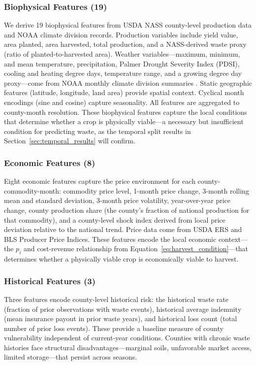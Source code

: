\documentclass[preprint,12pt,authoryear]{elsarticle}
\begin{document}
\subsubsection{Biophysical Features (19)}

We derive 19 biophysical features from USDA NASS county-level production data and NOAA climate division records. Production variables include yield value, area planted, area harvested, total production, and a NASS-derived waste proxy (ratio of planted-to-harvested area). Weather variables---maximum, minimum, and mean temperature, precipitation, Palmer Drought Severity Index (PDSI), cooling and heating degree days, temperature range, and a growing degree day proxy---come from NOAA monthly climate division summaries \citep{noaa2024}. Static geographic features (latitude, longitude, land area) provide spatial context. Cyclical month encodings (sine and cosine) capture seasonality. All features are aggregated to county-month resolution. These biophysical features capture the local conditions that determine whether a crop is physically viable---a necessary but insufficient condition for predicting waste, as the temporal split results in Section~\ref{sec:temporal_results} will confirm.

\subsubsection{Economic Features (8)}

Eight economic features capture the price environment for each county-commodity-month: commodity price level, 1-month price change, 3-month rolling mean and standard deviation, 3-month price volatility, year-over-year price change, county production share (the county's fraction of national production for that commodity), and a county-level shock index derived from local price deviation relative to the national trend. Price data come from USDA ERS \citep{usdaers2024} and BLS Producer Price Indices. These features encode the local economic context---the $p_i$ and cost-revenue relationship from Equation~\eqref{eq:harvest_condition}---that determines whether a physically viable crop is economically viable to harvest.

\subsubsection{Historical Features (3)}

Three features encode county-level historical risk: the historical waste rate (fraction of prior observations with waste events), historical average indemnity (mean insurance payout in prior waste years), and historical loss count (total number of prior loss events). These provide a baseline measure of county vulnerability independent of current-year conditions. Counties with chronic waste histories face structural disadvantages---marginal soils, unfavorable market access, limited storage---that persist across seasons.
\end{document}
